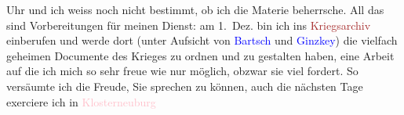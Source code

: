                Uhr und ich weiss noch nicht bestimmt, ob ich die Materie beherrsche. All das sind
               Vorbereitungen für meinen Dienst: am 1. Dez.{ }{\pb}bin ich ins \textcolor{brown}{Kriegsarchiv}\ledrightnote{\textcolor{brown}{Kriegsarchiv}} einberufen und werde dort (unter Aufsicht von
                  \textcolor{blue}{Bartsch}\ledrightnote{\textcolor{blue}{Rudolf Hans Bartsch}} und \textcolor{blue}{Ginzkey}\ledrightnote{\textcolor{blue}{Franz Karl Ginzkey}}) die vielfach geheimen Documente des Krieges zu ordnen
               und zu gestalten haben, eine Arbeit auf die ich mich so sehr freue wie nur möglich,
               obzwar sie viel fordert. So versäumte ich die Freude, Sie sprechen zu können, auch
               die nächsten Tage exerciere ich in \textcolor{pink}{Klosterneuburg}\ledrightnote{\textcolor{pink}{Klosterneuburg}}

